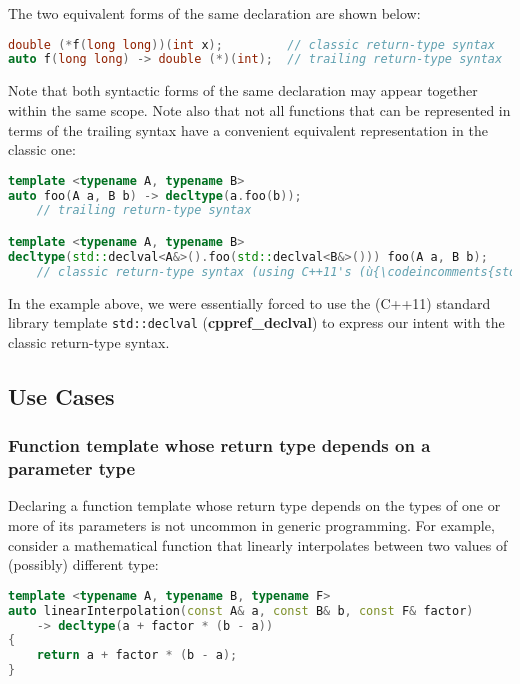 \noindent The two equivalent forms of the same declaration are shown below:

\begin{lstlisting}[language=C++]
double (*f(long long))(int x);         // classic return-type syntax
auto f(long long) -> double (*)(int);  // trailing return-type syntax
\end{lstlisting}
    
\noindent Note that both syntactic forms of the same declaration may appear
together within the same scope. Note also that not all functions that
can be represented in terms of the trailing syntax have a convenient
equivalent representation in the classic one:

\begin{lstlisting}[language=C++]
template <typename A, typename B>
auto foo(A a, B b) -> decltype(a.foo(b));
    // trailing return-type syntax

template <typename A, typename B>
decltype(std::declval<A&>().foo(std::declval<B&>())) foo(A a, B b);
    // classic return-type syntax (using C++11's (ù{\codeincomments{std::declval}}ù))
\end{lstlisting}
    
\noindent In the example above, we were essentially forced to use the (C++11)
standard library template \texttt{std::declval}
(\textbf{{cppref\_declval}}) to express our intent with the classic
return-type syntax.

\subsection[Use Cases]{Use Cases}\label{use-cases}

\subsubsection[Function template whose return type depends on a parameter type]{Function template whose return type depends on a parameter type}\label{function-template-whose-return-type-depends-on-a-parameter-type}

Declaring a function template whose return type depends on the types of
one or more of its parameters is not uncommon in generic programming.
For example, consider a mathematical function that linearly interpolates
between two values of (possibly) different type:

\begin{lstlisting}[language=C++]
template <typename A, typename B, typename F>
auto linearInterpolation(const A& a, const B& b, const F& factor)
    -> decltype(a + factor * (b - a))
{
    return a + factor * (b - a);
}
\end{lstlisting}
    
